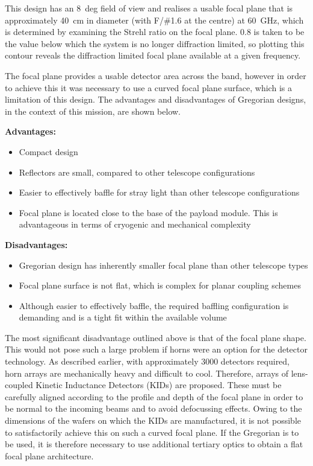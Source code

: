 \documentclass[11pt,a4paper]{article}
\begin{document}
This design has an 8~deg field of view and realises a usable focal plane that is approximately 40~cm in diameter (with F/\#1.6 at the centre) at 60~GHz, which is determined by examining the Strehl ratio on the focal plane. 0.8 is taken to be the value below which the system is no longer diffraction limited, so plotting this contour reveals the diffraction limited focal plane available at a given frequency. 

The focal plane provides a usable detector area across the band, however in order to achieve this it was necessary to use a curved focal plane surface, which is a limitation of this design. The advantages and disadvantages of Gregorian designs, in the context of this mission, are shown below. 


\textbf{Advantages:}
\begin{itemize}
	\item Compact design
	\item Reflectors are small, compared to other telescope configurations
	\item Easier to effectively baffle for stray light than other telescope configurations
	\item Focal plane is located close to the base of the payload module. This is advantageous in terms of cryogenic and mechanical complexity
\end{itemize}

\textbf{Disadvantages:}
\begin{itemize}
	\item Gregorian design has inherently smaller focal plane than other telescope types
	\item Focal plane surface is not flat, which is complex for planar coupling schemes
	\item Although easier to effectively baffle, the required baffling configuration is demanding and is a tight fit within the available volume
\end{itemize}
The most significant disadvantage outlined above is that of the focal plane shape. This would not pose such a large problem if horns were an option for the detector technology. As described earlier, with approximately 3000 detectors required, horn arrays are mechanically heavy and difficult to cool. Therefore, arrays of lens-coupled  Kinetic Inductance Detectors (KIDs) are proposed. These must be carefully aligned according to the profile and depth of the focal plane in order to be normal to the incoming beams and to avoid defocussing effects. Owing to the dimensions of the wafers on which the KIDs are manufactured, it is not possible to satisfactorily achieve this on such a curved focal plane. If the Gregorian is to be used, it is therefore necessary to use additional tertiary optics to obtain a flat focal plane architecture.
\end{document}
